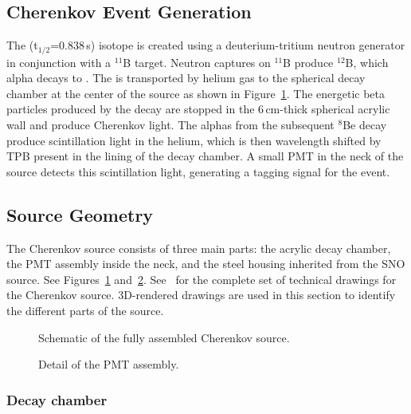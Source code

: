 \subsection{Cherenkov Event Generation}

The \Li (t$_{1/2}$=0.838\,s) isotope is created using a deuterium-tritium neutron generator in conjunction with a $^{11}$B target.
Neutron captures on $^{11}$B produce $^{12}$B, which alpha decays to \Li.
The \Li is transported by helium gas to the spherical decay chamber at the center of the source as shown in Figure~\ref{fig:design-1}. 
The energetic beta particles produced by the decay are stopped in the 6\,cm-thick spherical acrylic wall and produce Cherenkov light. 
The alphas from the subsequent $^{8}$Be decay produce scintillation light in the helium, which is then wavelength shifted by TPB present in the lining of the decay chamber.
A small PMT in the neck of the source detects this scintillation light, generating a tagging signal for the event. 

\subsection{Source Geometry}
The Cherenkov source consists of three main parts: the acrylic decay chamber, the PMT assembly inside the neck, and the steel housing inherited from the SNO \Li source. See Figures~\ref{fig:design-1} and~\ref{fig:design-2}.
See~\cite{wallig:2015} for the complete set of technical drawings for the Cherenkov source. 3D-rendered drawings are used in this section to identify the different parts of the source.

\begin{figure}
\caption{\label{fig:design-1}Schematic of the fully assembled Cherenkov source.}
\end{figure}

\begin{figure}
\caption{\label{fig:design-2}Detail of the PMT assembly.}
\end{figure}

\subsubsection{Decay chamber}


